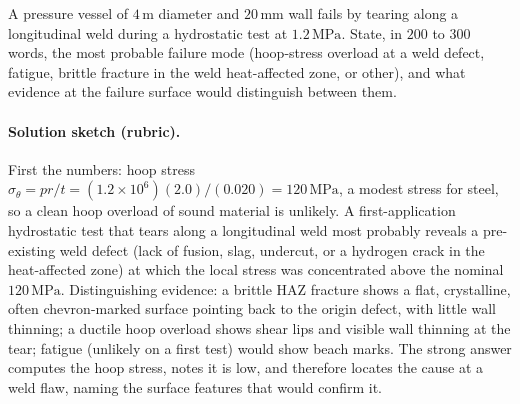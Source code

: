 \begin{exercise}
A pressure vessel of $4\,\si{\meter}$ diameter and $20\,\si{\milli
\meter}$ wall fails by tearing along a longitudinal weld during a
hydrostatic test at $1.2\,\text{MPa}$. State, in $200$ to $300$
words, the most probable failure mode (hoop-stress overload at a
weld defect, fatigue, brittle fracture in the weld heat-affected
zone, or other), and what evidence at the failure surface would
distinguish between them.
\paragraph{Solution sketch (rubric).} First the numbers: hoop stress
$\sigma_{\theta} = pr/t = (1.2\times 10^6)(2.0)/(0.020) = 120\,\text{
MPa}$, a modest stress for steel, so a clean hoop overload of sound
material is unlikely. A first-application hydrostatic test that tears
along a longitudinal weld most probably reveals a pre-existing weld
defect (lack of fusion, slag, undercut, or a hydrogen crack in the
heat-affected zone) at which the local stress was concentrated above
the nominal $120\,\text{MPa}$. Distinguishing evidence: a brittle
HAZ fracture shows a flat, crystalline, often chevron-marked surface
pointing back to the origin defect, with little wall thinning; a
ductile hoop overload shows shear lips and visible wall thinning at the
tear; fatigue (unlikely on a first test) would show beach marks. The
strong answer computes the hoop stress, notes it is low, and therefore
locates the cause at a weld flaw, naming the surface features that would
confirm it.
\end{exercise}

